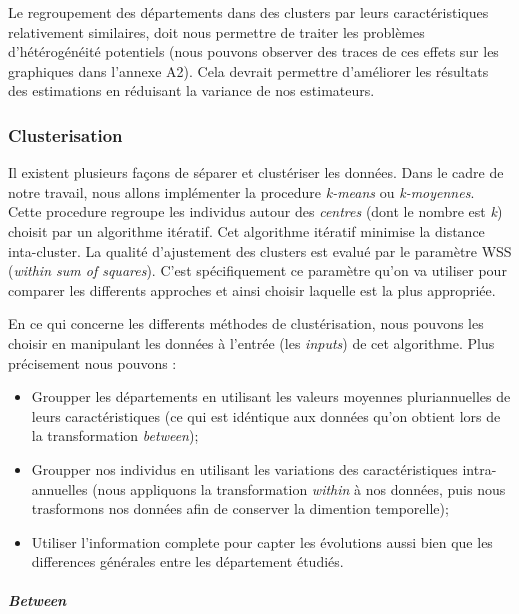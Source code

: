 \documentclass[11pt,]{article}
\providecommand{\tightlist}{%
  \setlength{\itemsep}{0pt}\setlength{\parskip}{0pt}}
\let\oldparagraph\paragraph
\renewcommand{\paragraph}[1]{\oldparagraph{#1}\mbox{}}
\begin{document}
Le regroupement des départements dans des clusters par leurs
caractéristiques relativement similaires, doit nous permettre de traiter
les problèmes d'hétérogénéité potentiels (nous pouvons observer des
traces de ces effets sur les graphiques dans l'annexe A2). Cela devrait
permettre d'améliorer les résultats des estimations en réduisant la
variance de nos estimateurs.

\hypertarget{clusterisation}{%
\subsubsection{Clusterisation}\label{clusterisation}}

Il existent plusieurs façons de séparer et clustériser les données. Dans
le cadre de notre travail, nous allons implémenter la procedure
\emph{k-means} ou \emph{k-moyennes}. Cette procedure regroupe les
individus autour des \emph{centres} (dont le nombre est \emph{k})
choisit par un algorithme itératif. Cet algorithme itératif minimise la
distance inta-cluster. La qualité d'ajustement des clusters est evalué
par le paramètre WSS (\emph{within sum of squares}). C'est
spécifiquement ce paramètre qu'on va utiliser pour comparer les
differents approches et ainsi choisir laquelle est la plus appropriée.

En ce qui concerne les differents méthodes de clustérisation, nous
pouvons les choisir en manipulant les données à l'entrée (les
\emph{inputs}) de cet algorithme. Plus précisement nous pouvons :

\begin{itemize}
\tightlist
\item
  Groupper les départements en utilisant les valeurs moyennes
  pluriannuelles de leurs caractéristiques (ce qui est idéntique aux
  données qu'on obtient lors de la transformation \emph{between});
\item
  Groupper nos individus en utilisant les variations des
  caractéristiques intra-annuelles (nous appliquons la transformation
  \emph{within} à nos données, puis nous trasformons nos données afin de
  conserver la dimention temporelle);
\item
  Utiliser l'information complete pour capter les évolutions aussi bien
  que les differences générales entre les département étudiés.
\end{itemize}

\hypertarget{between}{%
\paragraph{\texorpdfstring{\emph{Between}}{Between}}\label{between}}
\end{document}
